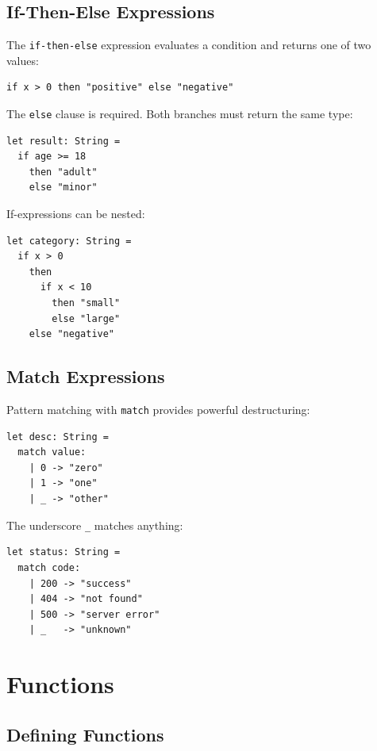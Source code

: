 \documentclass[11pt,twoside,openright]{book}
\begin{document}
\section{If-Then-Else Expressions}

The \texttt{if-then-else} expression evaluates a condition and returns one of two values:

\begin{lstlisting}[language=ConstructLang]
if x > 0 then "positive" else "negative"
\end{lstlisting}

The \texttt{else} clause is required. Both branches must return the same type:

\begin{lstlisting}[language=ConstructLang]
let result: String =
  if age >= 18
    then "adult"
    else "minor"
\end{lstlisting}

If-expressions can be nested:

\begin{lstlisting}[language=ConstructLang]
let category: String =
  if x > 0
    then
      if x < 10
        then "small"
        else "large"
    else "negative"
\end{lstlisting}

\section{Match Expressions}

Pattern matching with \texttt{match} provides powerful destructuring:

\begin{lstlisting}[language=ConstructLang]
let desc: String =
  match value:
    | 0 -> "zero"
    | 1 -> "one"
    | _ -> "other"
\end{lstlisting}

The underscore \texttt{\_} matches anything:

\begin{lstlisting}[language=ConstructLang]
let status: String =
  match code:
    | 200 -> "success"
    | 404 -> "not found"
    | 500 -> "server error"
    | _   -> "unknown"
\end{lstlisting}

\chapter{Functions}

\section{Defining Functions}
\end{document}
